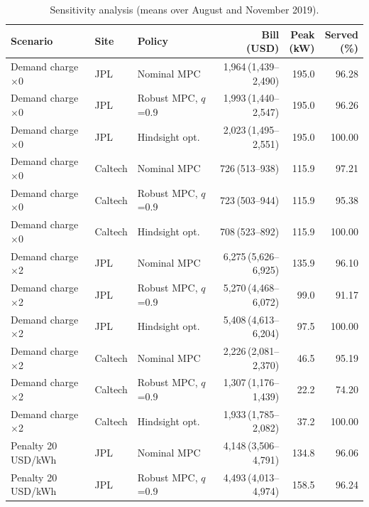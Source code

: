 \begin{table}[H]
\centering
\caption{Sensitivity analysis (means over August and November 2019).}
\label{tab:sens}
\footnotesize
\setlength{\tabcolsep}{1.5pt}
\begin{tabular*}{\textwidth}{@{\extracolsep{\fill}}lllrrr@{}}
\hline
Scenario & Site & Policy & \makecell[c]{Bill\\(USD)} & \makecell[c]{Peak\\(kW)} & \makecell[c]{Served\\(\%)} \\
\hline
Demand charge $\times$0 & JPL & Nominal MPC & 1,964\,{\scriptsize(1,439--2,490)} & 195.0 & 96.28 \\
Demand charge $\times$0 & JPL & Robust MPC, $q$=0.9 & 1,993\,{\scriptsize(1,440--2,547)} & 195.0 & 96.26 \\
Demand charge $\times$0 & JPL & Hindsight opt. & 2,023\,{\scriptsize(1,495--2,551)} & 195.0 & 100.00 \\
Demand charge $\times$0 & Caltech & Nominal MPC & 726\,{\scriptsize(513--938)} & 115.9 & 97.21 \\
Demand charge $\times$0 & Caltech & Robust MPC, $q$=0.9 & 723\,{\scriptsize(503--944)} & 115.9 & 95.38 \\
Demand charge $\times$0 & Caltech & Hindsight opt. & 708\,{\scriptsize(523--892)} & 115.9 & 100.00 \\
\hline
Demand charge $\times$2 & JPL & Nominal MPC & 6,275\,{\scriptsize(5,626--6,925)} & 135.9 & 96.10 \\
Demand charge $\times$2 & JPL & Robust MPC, $q$=0.9 & 5,270\,{\scriptsize(4,468--6,072)} & 99.0 & 91.17 \\
Demand charge $\times$2 & JPL & Hindsight opt. & 5,408\,{\scriptsize(4,613--6,204)} & 97.5 & 100.00 \\
Demand charge $\times$2 & Caltech & Nominal MPC & 2,226\,{\scriptsize(2,081--2,370)} & 46.5 & 95.19 \\
Demand charge $\times$2 & Caltech & Robust MPC, $q$=0.9 & 1,307\,{\scriptsize(1,176--1,439)} & 22.2 & 74.20 \\
Demand charge $\times$2 & Caltech & Hindsight opt. & 1,933\,{\scriptsize(1,785--2,082)} & 37.2 & 100.00 \\
\hline
Penalty 20\,USD/kWh & JPL & Nominal MPC & 4,148\,{\scriptsize(3,506--4,791)} & 134.8 & 96.06 \\
Penalty 20\,USD/kWh & JPL & Robust MPC, $q$=0.9 & 4,493\,{\scriptsize(4,013--4,974)} & 158.5 & 96.24 \\

\end{tabular*}
\end{table}
